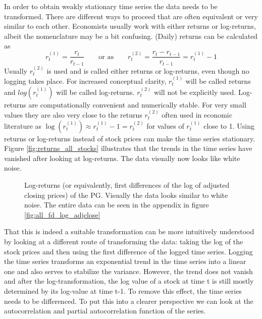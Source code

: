 In order to obtain weakly stationary time series the data needs to be transformed. There are different ways to proceed that are often equivalent or very similar to each other. Economists usually work with either returns or log-returns, albeit the nomenclature may be a bit confusing. (Daily) returns can be calculated as
\begin{equation*}
    r^{\scriptscriptstyle{(1)} }_t = \frac{r_t}{r_{t-1}} \qquad \text{or as} \qquad r^{\scriptscriptstyle{(2)}}_t = \frac{r_t - r_{t-1}}{r_{t-1}} = r^{\scriptscriptstyle{(1)}}_t - 1
\end{equation*}{}
Usually $r^{\scriptscriptstyle{(2)}}_t$ is used and is called either returns or log-returns, even though no logging takes place. For increased conceptual clarity, $r^{\scriptscriptstyle{(1)}}_t$ will be called returns and $log(r^{\scriptscriptstyle{(1)}}_t)$ will be called log-returns. $r^{\scriptscriptstyle{(2)}}_t$ will not be explicitly used. Log-returns are computationally convenient and numerically stable. For very small values they are also very close to the returns $r^{\scriptscriptstyle{(2)}}_t$ often used in economic literature as $ \log(r^{\scriptscriptstyle{(1)}}_t) \approx r^{\scriptscriptstyle{(1)}}_t - 1 = r^{\scriptscriptstyle{(2)}}_t$ for values of $r^{\scriptscriptstyle{(1)}}_t$ close to 1. Using returns or log-returns instead of stock prices can make the time series stationary. Figure \ref{fig:returns_all_stocks} illustrates that the trends in the time series have vanished after looking at log-returns. The data visually now looks like white noise. 

\begin{figure}[H]
    \centering
    \begin{adjustbox}{width=.9\textwidth,center}
    
    \end{adjustbox}  
    \caption{Log-returns (or equivalently, first differences of the log of adjusted closing prices) of the PG. Visually the data looks similar to white noise. The entire data can be seen in the appendix in figure \ref{fig:all_fd_log_adjclose}}
    \label{fig:PG_fd_log_adjclose}
\end{figure}{}

That this is indeed a suitable transformation can be more intuitively understood by looking at a different route of transforming the data: taking the log of the stock prices and then using the first difference of the logged time series. Logging the time series transforms an exponential trend in the time series into a linear one and also serves to stabilize the variance. However, the trend does not vanish and after the log-transformation, the log value of a stock at time t is still mostly determined by its log-value at time t-1. To remove this effect, the time series needs to be differenced. To put this into a clearer perspective we can look at the autocorrelation and partial autocorrelation function of the series. 

